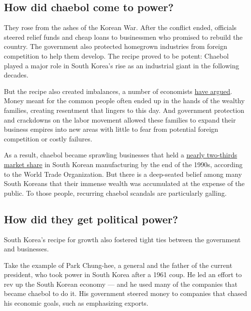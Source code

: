 \hypertarget{how-did-chaebol-come-to-power}{%
\subsection{How did chaebol come to
power?}\label{how-did-chaebol-come-to-power}}

They rose from the ashes of the Korean War. After the conflict ended,
officials steered relief funds and cheap loans to businessmen who
promised to rebuild the country. The government also protected homegrown
industries from foreign competition to help them develop. The recipe
proved to be potent: Chaebol played a major role in South Korea's rise
as an industrial giant in the following decades.

But the recipe also created imbalances, a number of economists
\href{http://econpapers.repec.org/bookchap/iieppress/25.htm}{have
argued}. Money meant for the common people often ended up in the hands
of the wealthy families, creating resentment that lingers to this day.
And government protection and crackdowns on the labor movement allowed
these families to expand their business empires into new areas with
little to fear from potential foreign competition or costly failures.

As a result, chaebol became sprawling businesses that held a
\href{https://www.google.com.hk/url?sa=t\&rct=j\&q=\&esrc=s\&source=web\&cd=1\&cad=rja\&uact=8\&ved=0ahUKEwjNmM630JbSAhWMmJQKHbuDDKoQFggaMAA\&url=https\%3A\%2F\%2Fdocsonline.wto.org\%2Fdol2fe\%2FPages\%2FFE_Search\%2FExportFile.aspx\%3FId\%3D35204\%26filename\%3DQ\%2FWT\%2FTPR\%2FS73-4.pdf\&usg=AFQjCNFsqkTSqiCciRt1XyLtVCGPRvv4qQ\&sig2=mnXQ9DuyOCwMnIEAu3da6A}{nearly
two-thirds market share} in South Korean manufacturing by the end of the
1990s, according to the World Trade Organization. But there is a
deep-seated belief among many South Koreans that their immense wealth
was accumulated at the expense of the public. To those people, recurring
chaebol scandals are particularly galling.

\hypertarget{how-did-they-get-political-power}{%
\subsection{How did they get political
power?}\label{how-did-they-get-political-power}}

South Korea's recipe for growth also fostered tight ties between the
government and businesses.

Take the example of Park Chung-hee, a general and the father of the
current president, who took power in South Korea after a 1961 coup. He
led an effort to rev up the South Korean economy --- and he used many of
the companies that became chaebol to do it. His government steered money
to companies that chased his economic goals, such as emphasizing
exports.

